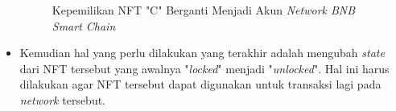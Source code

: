 \begin{itemize}
      \begin{figure} [H] \centering
        \caption{Kepemilikan NFT "C" Berganti Menjadi Akun \emph{Network BNB Smart Chain}}
        \label{fig:bridge_transfer}
        \end{figure}
      
      \item Kemudian hal yang perlu dilakukan yang terakhir adalah mengubah \emph{state} dari NFT tersebut yang awalnya "\emph{locked}" menjadi "\emph{unlocked}". Hal ini harus dilakukan agar NFT tersebut dapat digunakan untuk transaksi lagi pada \emph{network} tersebut.
      

\end{itemize}

